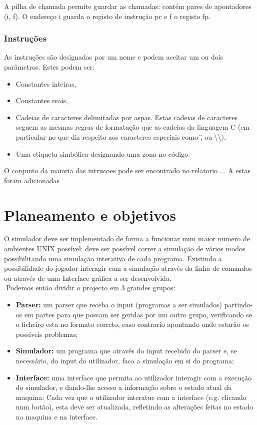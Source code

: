 \documentclass{report}
\begin{document}
A pilha de chamada permite guardar as chamadas: contém pares de apontadores
(i, f). O endereço i guarda o registo de instrução pc e f o registo fp.

\subsubsection{Instruções}

\quad As instruções são designadas por um nome e podem aceitar um ou dois parâmetros. Estes podem ser:
\begin{itemize}
\item Constantes inteiras,
\item Constantes reais,
\item Cadeias de caracteres delimitadas por aspas. Estas cadeias de caracteres seguem as
mesmas regras de formatação que as cadeias da linguagem C (em particular no que
diz respeito aos caracteres especiais como \", \n ou \textbackslash\textbackslash ),
\item Uma etiqueta simbólica designando uma zona no código.
\end{itemize}

\quad O conjunto da maioria das intrucoes pode ser encontrado no relatorio ...
A estas foram adicionadas

\section{Planeamento e objetivos}
\quad O simulador deve ser implementado de forma a funcionar num maior numero de ambientes UNIX possível:
deve ser possível correr a simulação de vários modos possibilitando uma simulação interativa de cada programa.
Existindo a possibilidade do jogador interagir com a simulação através da linha de comandos ou através de uma Interface
gráfica a ser desenvolvida.\\
.\quad Podemos então dividir o projecto em 3 grandes grupos:
\begin{itemize}
	\item \textbf{Parser:} um parser que receba o input
	(programas a ser simulados) partindo-os em partes para que possam ser geridas por um outro grupo,
	verificando se o ficheiro esta no formato correto, caso contrario apontando onde estarão os possíveis problemas;

	\item \textbf{Simulador:} um programa que através do input recebido do parser e, se necessário, do input do utilizador,
	faca a simulação em si do programa;

	\item \textbf{Interface:} uma interface que permita ao utilizador interagir com a execução do simulador,
	e dando-lhe acesso a informação sobre o estado atual da maquina;
	Cada vez que o utilizador interatue com a interface (e.g. clicando num botão), esta deve ser atualizada,
	refletindo as alterações feitas no estado na maquina e na interface.
\end{itemize}
\end{document}
